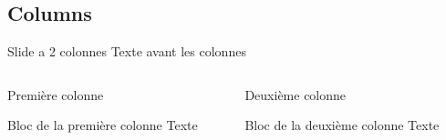 \documentclass[aspectratio=169]{beamer}
\begin{document}
\subsection{Columns}

\begin{frame}{Slide a 2 colonnes}
    Texte avant les colonnes
    \begin{columns}
        \begin{column}{.6\textwidth}
            Première colonne
            \begin{block}{Bloc de la première colonne}
                Texte
            \end{block}
        \end{column}
        \begin{column}{.4\textwidth}
            Deuxième colonne
            \begin{block}{Bloc de la deuxième colonne}
                Texte
            \end{block}
        \end{column}
    \end{columns}
\end{frame}


\end{document}
